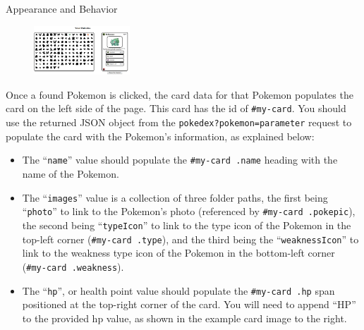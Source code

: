 \documentclass[programming]{../../../../mfcs}
\begin{document}
\begin{question}{Appearance and Behavior}
    \begin{figure}
    \includegraphics[width=0.32\textwidth]{bulbasaur-card.png}
    \end{figure}
  Once a found Pokemon is clicked, the card data for that Pokemon populates the card on the left
  side of the page. This card has the id of \texttt{\#my-card}. You should use the returned JSON
  object from the \texttt{pokedex?pokemon=parameter} request to populate the card with the Pokemon's
  information, as explained below:
  \begin{itemize}
    \item The ``\texttt{name}'' value should populate the \texttt{\#my-card .name} heading with the
      name of the Pokemon. 
    \item The ``\texttt{images}'' value is a collection of three folder paths, the first being
      ``\texttt{photo}'' to link to the Pokemon's photo (referenced by \texttt{\#my-card .pokepic}), the second being ``\texttt{typeIcon}'' to link to the
      type icon of the Pokemon in the top-left corner (\texttt{\#my-card .type}), and the third being the ``\texttt{weaknessIcon}'' to link to the weakness
      type icon of the Pokemon in the bottom-left corner (\texttt{\#my-card
      .weakness}).
    \item The ``\texttt{hp}'', or health point value should populate the \texttt{\#my-card .hp} span positioned at the top-right corner of the card. You will need to append ``HP'' to
      the provided hp value, as shown in the example card image to the right.
  \end{itemize}


\end{question}
\end{document}
